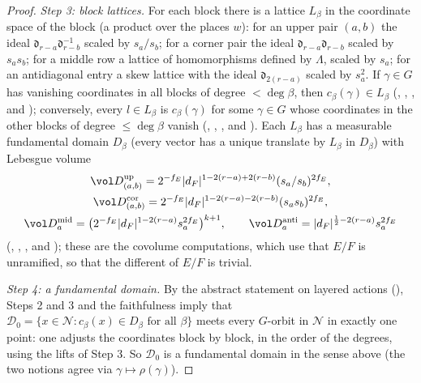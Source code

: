 \begin{proof}
\emph{Step 3: block lattices.} For each block there is a lattice $L_\beta$ in the coordinate space of the block (a product over the
places $w$): for an upper pair $(a,b)$ the ideal $\mathfrak d_{r-a}\mathfrak d_{r-b}^{-1}$ scaled by $s_a/s_b$; for a corner pair
the ideal $\mathfrak d_{r-a}\mathfrak d_{r-b}$ scaled by $s_as_b$; for a middle row a lattice of homomorphisms defined by $\Lambda$,
scaled by $s_a$; for an antidiagonal entry a skew lattice with the ideal $\mathfrak d_{2(r-a)}$ scaled by $s_a^2$. If $\gamma\in G$ has
vanishing coordinates in all blocks of degree $<\deg\beta$, then $c_\beta(\gamma)\in L_\beta$
(, , , and ); conversely, every $l\in L_\beta$ is $c_\beta(\gamma)$ for some
$\gamma\in G$ whose coordinates in the other blocks of degree $\le\deg\beta$ vanish
(, , , and ). Each
$L_\beta$ has a measurable fundamental domain $D_\beta$ (every vector has a unique translate by $L_\beta$ in $D_\beta$) with Lebesgue volume
\begin{gather*}
\vol D_{(a,b)}^{\mathrm{up}}=2^{-f_E}|d_F|^{1-2(r-a)+2(r-b)}(s_a/s_b)^{2f_E},\\
\vol D_{(a,b)}^{\mathrm{cor}}=2^{-f_E}|d_F|^{1-2(r-a)-2(r-b)}(s_as_b)^{2f_E},\\
\vol D_a^{\mathrm{mid}}=\bigl(2^{-f_E}|d_F|^{1-2(r-a)}s_a^{2f_E}\bigr)^{k+1},\qquad
\vol D_a^{\mathrm{anti}}=|d_F|^{\frac12-2(r-a)}s_a^{2f_E}
\end{gather*}
(, , , and ); these
are the covolume computations, which use that $E/F$ is unramified, so that the different of $E/F$ is trivial.

\emph{Step 4: a fundamental domain.} By the abstract statement on layered actions
(), Steps 2 and 3 and the faithfulness imply that
$\mathcal D_0=\{x\in\mathcal N:c_\beta(x)\in D_\beta\text{ for all }\beta\}$ meets every $G$-orbit in $\mathcal N$ in exactly one point:
one adjusts the coordinates block by block, in the order of the degrees, using the lifts of Step 3. So $\mathcal D_0$ is a fundamental
domain in the sense above (the two notions agree via $\gamma\mapsto\rho(\gamma)$).


\end{proof}
